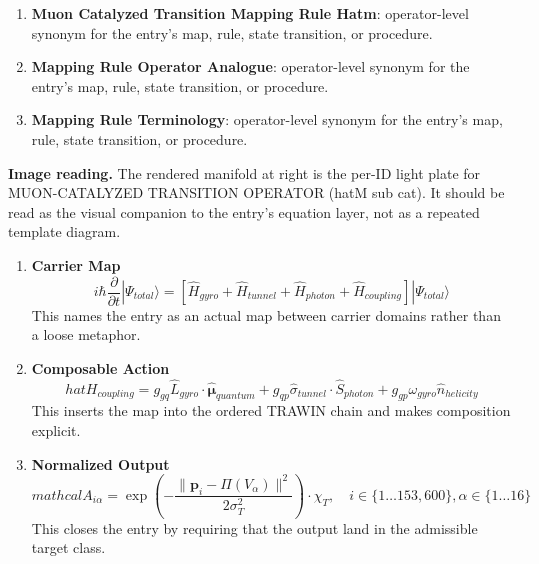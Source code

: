 \begin{enumerate}[leftmargin=1.6em,itemsep=6pt,topsep=4pt]
\item \textbf{Muon Catalyzed Transition Mapping Rule Hatm}: operator-level synonym for the entry's map, rule, state transition, or procedure.
\item \textbf{Mapping Rule Operator Analogue}: operator-level synonym for the entry's map, rule, state transition, or procedure.
\item \textbf{Mapping Rule Terminology}: operator-level synonym for the entry's map, rule, state transition, or procedure.
\end{enumerate}

\begin{samepage}
\noindent\begin{minipage}[t]{0.45\linewidth}
\vspace{0pt}
\raggedright
\scriptsize\textbf{Image reading.} The rendered manifold at right is the per-ID light plate for MUON-CATALYZED TRANSITION OPERATOR (hatM sub cat). It should be read as the visual companion to the entry's equation layer, not as a repeated template diagram.\par
\end{minipage}\hfill
\begin{minipage}[t]{0.53\linewidth}
\vspace*{-0.10in}
\raggedright
{}
\end{minipage}
\end{samepage}

\clearpage


\begin{enumerate}[leftmargin=1.6em,itemsep=9pt,topsep=6pt]
\item \textbf{Carrier Map}
\[
i\hbar\frac{\partial}{\partial t}|\Psi_{total}\rangle = \left[\hat{H}_{gyro} + \hat{H}_{tunnel} + \hat{H}_{photon} + \hat{H}_{coupling}\right]|\Psi_{total}\rangle
\]
This names the entry as an actual map between carrier domains rather than a loose metaphor.

\item \textbf{Composable Action}
\[
hat{H}_{coupling} = g_{gq}\hat{L}_{gyro} \cdot \hat{\boldsymbol{\mu}}_{quantum} + g_{qp}\hat{\sigma}_{tunnel} \cdot \hat{S}_{photon} + g_{gp}\omega_{gyro}\hat{n}_{helicity}
\]
This inserts the map into the ordered TRAWIN chain and makes composition explicit.

\item \textbf{Normalized Output}
\[
mathcal{A}_{i \alpha} = \exp\left( -\frac{\|\mathbf{p}_i - \Pi(V_\alpha)\|^2}{2\sigma_T^2} \right) \cdot \chi_T, \quad i \in \{1 \dots 153,600\}, \alpha \in \{1 \dots 16\}
\]
This closes the entry by requiring that the output land in the admissible target class.
\end{enumerate}

